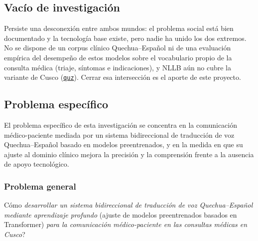\documentclass[12pt,a4paper]{article}
\newcommand{\obsdos}[1]{\textcolor{verdeOK}{#1}}
\DeclareRobustCommand{\sig}[1]{\hyperlink{sig:#1}{\texttt{#1}}}
\begin{document}
\subsection{Vac{\'i}o de investigaci{\'o}n}
Persiste una desconexi{\'o}n entre ambos mundos: el problema social est{\'a} bien documentado y la
tecnolog{\'i}a base existe, pero nadie ha unido los dos extremos. No se dispone de un corpus
cl{\'i}nico Quechua--Espa{\~n}ol ni de una evaluaci{\'o}n emp{\'i}rica del desempe{\~n}o de estos
modelos sobre el vocabulario propio de la consulta m{\'e}dica (triaje, s{\'i}ntomas e indicaciones),
y NLLB a{\'u}n no cubre la variante de Cusco (\sig{quz}). Cerrar esa intersecci{\'o}n es el aporte
de este proyecto.

\subsection{Problema espec{\'i}fico}
El problema espec{\'i}fico de esta investigaci{\'o}n se concentra en la comunicaci{\'o}n
m{\'e}dico-paciente mediada por un sistema bidireccional de traducci{\'o}n de voz Quechua--Espa{\~n}ol
basado en modelos preentrenados, y en la medida en que su ajuste al dominio cl{\'i}nico mejora la
precisi{\'o}n y la comprensi{\'o}n frente a la ausencia de apoyo tecnol{\'o}gico.

\subsubsection{Problema general}
{\textquestiondown}\obsdos{C{\'o}mo \emph{desarrollar un sistema bidireccional de traducci{\'o}n de voz
Quechua--Espa{\~n}ol} \emph{mediante aprendizaje profundo} (ajuste de modelos preentrenados basados en
Transformer) \emph{para la comunicaci{\'o}n m{\'e}dico-paciente en las consultas m{\'e}dicas en Cusco}?}
\end{document}
